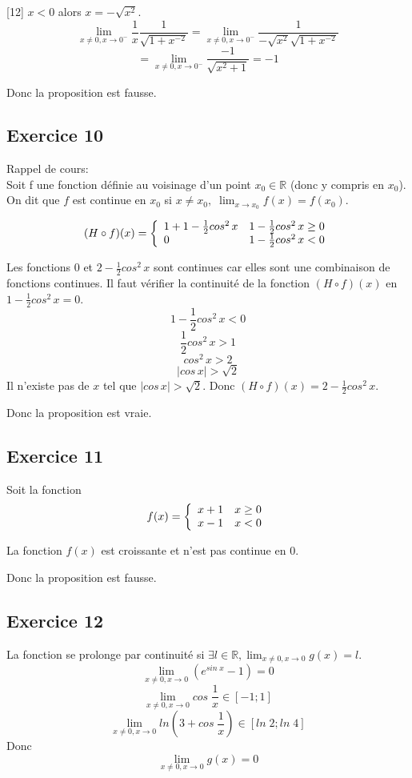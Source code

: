 \documentclass[]{book}
\theoremstyle{definition}
\newcommand{\bb}[1]{\mathbb{#1}}
\newcommand{\R}{\bb{R}}
\begin{document}
[12] $x<0$ alors $x = -\sqrt{x^2}$.
$$ \lim_{x \neq 0, x \to 0^{-}} \frac{1}{x} \frac{1}{\sqrt{1+x^{-2}}} = \lim_{x \neq 0, x \to 0^{-}} \frac{1}{-\sqrt{x^2}\sqrt{1+x^{-2}}}$$
$$ = \lim_{x \neq 0, x \to 0^{-}} \frac{-1}{\sqrt{x^2+1}} = -1$$



Donc la proposition est fausse.


\subsection*{Exercice 10}
Rappel de cours:\\
Soit f une fonction d\'efinie au voisinage d'un point $x_0 \in \R$ (donc y compris en
$x_0$). On dit que $f$ est continue en $x_0$ si $x \ne x_0,\;\lim_{x \to x_0} f(x) = f(x_0)$.


$$(H \circ f) (x) = 
\left\{ 
\begin{array}{l l}
 1 + 1 -\frac{1}{2}cos^2\, x & 1 -\frac{1}{2}cos^2\, x \ge 0\\
 0 & 1 -\frac{1}{2}cos^2\, x < 0\\
\end{array}
\right. 
$$

Les fonctions $0$ et $2 -\frac{1}{2}cos^2\, x$ sont continues car elles sont une combinaison de fonctions continues. Il faut v\'erifier la continuit\'e de la fonction $(H \circ f) (x)$ en $1 -\frac{1}{2}cos^2\, x = 0$.
$$1 -\frac{1}{2}cos^2\, x < 0$$
$$\frac{1}{2}cos^2\, x > 1$$
$$cos^2\, x > 2$$
$$|cos\, x| > \sqrt{2}$$
Il n'existe pas de $x$ tel que $|cos\, x| > \sqrt{2}$. Donc $(H \circ f) (x) = 2 -\frac{1}{2}cos^2\, x$.


Donc la proposition est vraie.

\subsection*{Exercice 11}
Soit la fonction 
$$f(x) = 
\left\{ 
\begin{array}{l l}
 x+1 & x \ge 0\\
 x-1 & x < 0\\
\end{array}
\right. 
$$

La fonction $f(x)$ est croissante et n'est pas continue en 0.


Donc la proposition est fausse.

\subsection*{Exercice 12}
La fonction se prolonge par continuit\'e si $\exists l \in \R, \lim_{x \neq 0, x \to 0} g(x) = l$.
$$\lim_{x \neq 0, x \to 0} (e^{sin\; x}-1) = 0$$
$$\lim_{x \neq 0, x \to 0} cos\; \frac{1}{x} \in [-1;1]$$
$$\lim_{x \neq 0, x \to 0} ln(3+cos\; \frac{1}{x}) \in [ln\; 2; ln\; 4]$$
Donc
$$\lim_{x \neq 0, x \to 0} g(x) = 0$$
\end{document}
